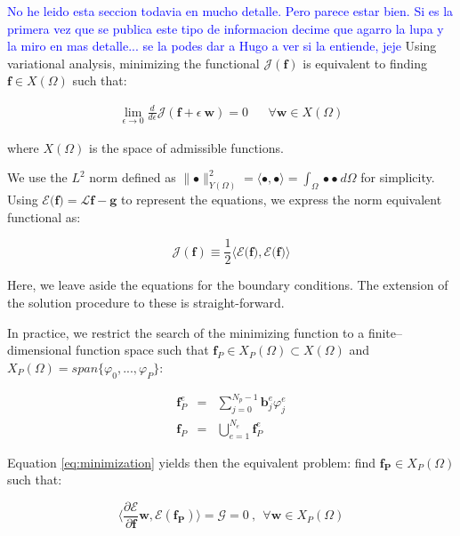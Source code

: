 \documentclass{CFD2011}
\newcommand{\Pablo}[1]{\textcolor{blue}{#1}}
\begin{document}
\Pablo{No he leido esta seccion todavia en mucho detalle. Pero parece estar bien. Si es la primera vez que se publica este tipo de informacion decime que agarro la lupa y la miro en mas detalle... se la podes dar a Hugo a ver si la entiende, jeje }
Using variational analysis, minimizing the functional $\mathcal{J}(\mathbf{f})$ is equivalent to finding $\mathbf{f} \in X(\Omega)$ such that:

\begin{eqnarray}
\lim_{\epsilon \to 0} \frac{d}{d\epsilon}{\mathcal{J}(\mathbf{f}+\epsilon \ \mathbf{w})}=0 && \forall \mathbf{w} \in X(\Omega)
\label{eq:minimization}
\end{eqnarray}

\noindent where $X(\Omega)$ is the space of admissible functions.

We use the $L^2$ norm defined as $\parallel \bullet  \parallel_{Y(\Omega)}^2= \langle \bullet, \bullet \rangle= \int_\Omega  \bullet \bullet   \ d\Omega$ for simplicity. Using $\mathcal{E} {(}\mathbf{f} {)}=\mathcal{L}\mathbf{f}-\mathbf{g}$ to represent the equations, we express the norm equivalent functional as:

\begin{equation}
\mathcal{J}(\mathbf{f})\equiv  \frac{1}{2} \langle \mathcal{E} {(}\mathbf{f} {)},\mathcal{E} {(}\mathbf{f} {)} \rangle
\end{equation}

Here, we leave aside the equations for the boundary conditions. The extension of the solution procedure to these is straight-forward. 

In practice, we restrict the search of the minimizing function to a finite--dimensional function space such that $\mathbf{f}_P \in X_P(\Omega) \subset X(\Omega)$ and $X_P(\Omega)= span\{ \varphi_0,...,\varphi_P \} $:

\begin{eqnarray}
\mathbf{f}_P^e&=&\sum_{j=0}^{N_p-1} \mathbf{b}_j^e \varphi_j^e \label{eq:suma} \\
\mathbf{f}_P&=&\bigcup _{e=1}^{N_e}\mathbf{f}_P^e
\end{eqnarray}


Equation \ref{eq:minimization} yields then the equivalent problem: find $\mathbf{f_P} \in X_P(\Omega)$ such that:

\begin{equation}
\big\langle \frac{\partial\mathcal{E}}{\partial \mathbf{f}}\mathbf{w} , \mathcal{E}(\mathbf{f_P}) \big\rangle=\mathcal{G}=0 \ ,\ \ \forall \mathbf{w}\in X_P(\Omega)
\end{equation}
\end{document}
